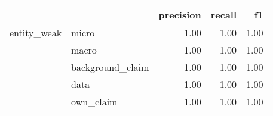 \begin{tabular}{llrrr}
\toprule
            &           &  precision &  recall &   f1 \\
\midrule
entity\_weak & micro &       1.00 &    1.00 & 1.00 \\
            & macro &       1.00 &    1.00 & 1.00 \\
            & background\_claim &       1.00 &    1.00 & 1.00 \\
            & data &       1.00 &    1.00 & 1.00 \\
            & own\_claim &       1.00 &    1.00 & 1.00 \\
\bottomrule
\end{tabular}
